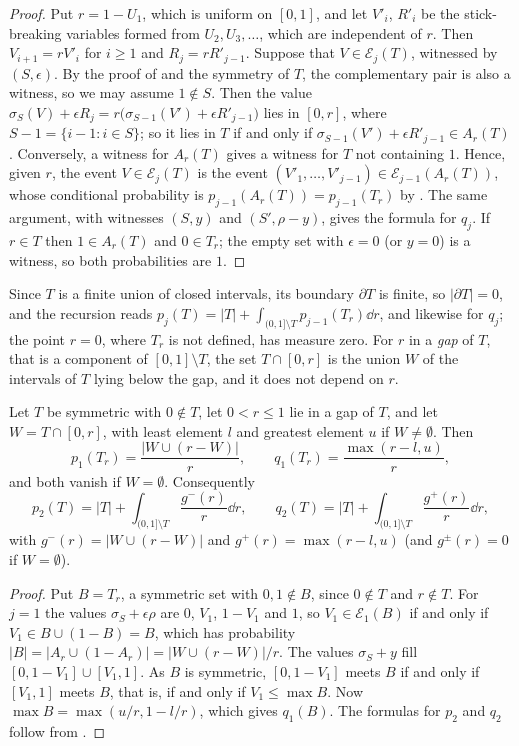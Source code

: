 \documentclass[11pt,colorlinks]{charlie}
\newcommand{\cE}{\mathcal{E}}
\begin{document}
\begin{proof}
Put $r=1-U_1$, which is uniform on $[0,1]$, and let $V'_i$, $R'_i$ be the stick-breaking variables formed from $U_2,U_3,\dots$, which are independent of $r$. Then $V_{i+1}=rV'_i$ for $i\ge1$ and $R_j=rR'_{j-1}$. Suppose that $V\in\cE_j(T)$, witnessed by $(S,\epsilon)$. By the proof of  and the symmetry of $T$, the complementary pair is also a witness, so we may assume $1\notin S$. Then the value $\sigma_S(V)+\epsilon R_j=r\big(\sigma_{S-1}(V')+\epsilon R'_{j-1}\big)$ lies in $[0,r]$, where $S-1=\{i-1:i\in S\}$; so it lies in $T$ if and only if $\sigma_{S-1}(V')+\epsilon R'_{j-1}\in A_r(T)$. Conversely, a witness for $A_r(T)$ gives a witness for $T$ not containing $1$. Hence, given $r$, the event $V\in\cE_j(T)$ is the event $(V'_1,\dots,V'_{j-1})\in\cE_{j-1}(A_r(T))$, whose conditional probability is $p_{j-1}(A_r(T))=p_{j-1}(T_r)$ by . The same argument, with witnesses $(S,y)$ and $(S',\rho-y)$, gives the formula for $q_j$. If $r\in T$ then $1\in A_r(T)$ and $0\in T_r$; the empty set with $\epsilon=0$ (or $y=0$) is a witness, so both probabilities are $1$.
\end{proof}

Since $T$ is a finite union of closed intervals, its boundary $\partial T$ is finite, so $|\partial T|=0$, and the recursion reads $p_j(T)=|T|+\int_{(0,1]\setminus T}p_{j-1}(T_r)\dd r$, and likewise for $q_j$; the point $r=0$, where $T_r$ is not defined, has measure zero. For $r$ in a \emph{gap} of $T$, that is a component of $[0,1]\setminus T$, the set $T\cap[0,r]$ is the union $W$ of the intervals of $T$ lying below the gap, and it does not depend on $r$.

\begin{lemma}\label{lem:last}
Let $T$ be symmetric with $0\notin T$, let $0<r\le1$ lie in a gap of $T$, and let $W=T\cap[0,r]$, with least element $l$ and greatest element $u$ if $W\ne\emptyset$. Then
\[
 p_1(T_r)=\frac{|W\cup(r-W)|}r,\qquad q_1(T_r)=\frac{\max(r-l,u)}r,
\]
and both vanish if $W=\emptyset$. Consequently
\[
 p_2(T)=|T|+\int_{(0,1]\setminus T}\frac{g^-(r)}r\dd r,\qquad q_2(T)=|T|+\int_{(0,1]\setminus T}\frac{g^+(r)}r\dd r,
\]
with $g^-(r)=|W\cup(r-W)|$ and $g^+(r)=\max(r-l,u)$ (and $g^\pm(r)=0$ if $W=\emptyset$).
\end{lemma}

\begin{proof}
Put $B=T_r$, a symmetric set with $0,1\notin B$, since $0\notin T$ and $r\notin T$. For $j=1$ the values $\sigma_S+\epsilon\rho$ are $0$, $V_1$, $1-V_1$ and $1$, so $V_1\in\cE_1(B)$ if and only if $V_1\in B\cup(1-B)=B$, which has probability $|B|=|A_r\cup(1-A_r)|=|W\cup(r-W)|/r$. The values $\sigma_S+y$ fill $[0,1-V_1]\cup[V_1,1]$. As $B$ is symmetric, $[0,1-V_1]$ meets $B$ if and only if $[V_1,1]$ meets $B$, that is, if and only if $V_1\le\max B$. Now $\max B=\max(u/r,1-l/r)$, which gives $q_1(B)$. The formulas for $p_2$ and $q_2$ follow from .
\end{proof}
\end{document}
